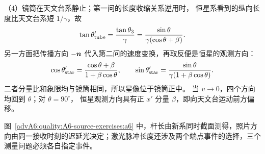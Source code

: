\begin{advsolution}
（4）镜筒在天文台系静止；第一问的长度收缩关系逆用时，
恒星系看到的纵向长度比天文台系短 $1/\gamma$，故
\[
 \tan\theta'_{\rm tube}=\frac{\tan\theta_3}{\gamma}
 =\frac{\sin\theta}{\gamma(\cos\theta+\beta)}.
\]
另一方面把传播方向 $-\bm{n}$ 代入第二问的速度变换，再取反便是恒星的观测方向：
\[
 \cos\theta'_{\rm star}=\frac{\cos\theta+\beta}{1+\beta\cos\theta},\qquad
 \sin\theta'_{\rm star}=\frac{\sin\theta}{\gamma(1+\beta\cos\theta)}.
\]
二者分量比和象限均与镜筒相同，所以星像位于镜筒正中。
当 $v\to0$，四个方向均回到 $\theta$；对 $\theta=90^\circ$，
恒星观测方向具有正 $x'$ 分量 $\beta$，即向天文台运动前方偏移。

图~\ref{advA6:quality:A6-source-exercises:a6} 中，杆长由新系同时截面测得，照片方向由同一接收时刻的迟延光决定；激光脉冲长度还涉及两个端点事件的选择，三个测量问题必须各自指定事件。
\end{advsolution}


